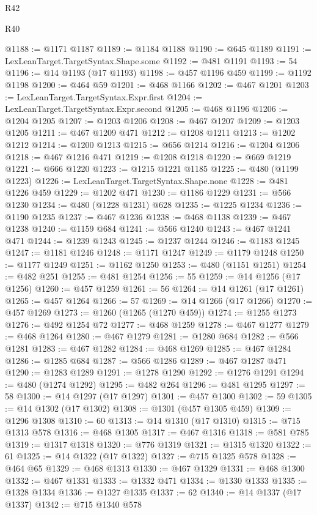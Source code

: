 \begin{lexlean}{R42}
\begin{lexlean}{R40}
\begin{coremodule}
{{{{{{{{{{{{{{{{{{{{{{{{{{{{{{{{{{{{{{{{{{{{{{{{{{{{{{{{{{{{{{{{{{{{{{{{{{{{{{{{{{{{{{{{{{{{{{{{{{{{{{{{{{{{{@1188 := @1171 @1187
@1189 := @1184 @1188
@1190 := @645 @1189
@1191 := LexLeanTarget.TargetSyntax.Shape.some
@1192 := @481 @1191
@1193 := 54
@1196 := @14 @1193 (@17 @1193)
@1198 := @457 @1196 @459
@1199 := @1192 @1198
@1200 := @464 @59
@1201 := @468 @1166
@1202 := @467 @1201
@1203 := LexLeanTarget.TargetSyntax.Expr.first
@1204 := LexLeanTarget.TargetSyntax.Expr.second
@1205 := @468 @1196
@1206 := @1204 @1205
@1207 := @1203 @1206
@1208 := @467 @1207
@1209 := @1203 @1205
@1211 := @467 @1209 @471
@1212 := @1208 @1211
@1213 := @1202 @1212
@1214 := @1200 @1213
@1215 := @656 @1214
@1216 := @1204 @1206
@1218 := @467 @1216 @471
@1219 := @1208 @1218
@1220 := @669 @1219
@1221 := @666 @1220
@1223 := @1215 @1221 @1185
@1225 := @480 (@1199 @1223)
@1226 := LexLeanTarget.TargetSyntax.Shape.none
@1228 := @481 @1226 @459
@1229 := @1202 @471
@1230 := @1186 @1229
@1231 := @566 @1230
@1234 := @480 (@1228 @1231) @628
@1235 := @1225 @1234
@1236 := @1190 @1235
@1237 := @467 @1236
@1238 := @468 @1138
@1239 := @467 @1238
@1240 := @1159 @684
@1241 := @566 @1240
@1243 := @467 @1241 @471
@1244 := @1239 @1243
@1245 := @1237 @1244
@1246 := @1183 @1245
@1247 := @1181 @1246
@1248 := @1171 @1247
@1249 := @1179 @1248
@1250 := @1177 @1249
@1251 := @1162 @1250
@1253 := @480 (@1151 @1251)
@1254 := @482 @251
@1255 := @481 @1254
@1256 := 55
@1259 := @14 @1256 (@17 @1256)
@1260 := @457 @1259
@1261 := 56
@1264 := @14 @1261 (@17 @1261)
@1265 := @457 @1264
@1266 := 57
@1269 := @14 @1266 (@17 @1266)
@1270 := @457 @1269
@1273 := @1260 (@1265 (@1270 @459))
@1274 := @1255 @1273
@1276 := @492 @1254 @72
@1277 := @468 @1259
@1278 := @467 @1277
@1279 := @468 @1264
@1280 := @467 @1279
@1281 := @1280 @684
@1282 := @566 @1281
@1283 := @467 @1282
@1284 := @468 @1269
@1285 := @467 @1284
@1286 := @1285 @684
@1287 := @566 @1286
@1289 := @467 @1287 @471
@1290 := @1283 @1289
@1291 := @1278 @1290
@1292 := @1276 @1291
@1294 := @480 (@1274 @1292)
@1295 := @482 @264
@1296 := @481 @1295
@1297 := 58
@1300 := @14 @1297 (@17 @1297)
@1301 := @457 @1300
@1302 := 59
@1305 := @14 @1302 (@17 @1302)
@1308 := @1301 (@457 @1305 @459)
@1309 := @1296 @1308
@1310 := 60
@1313 := @14 @1310 (@17 @1310)
@1315 := @715 @1313 @578
@1316 := @468 @1305
@1317 := @467 @1316
@1318 := @581 @785
@1319 := @1317 @1318
@1320 := @776 @1319
@1321 := @1315 @1320
@1322 := 61
@1325 := @14 @1322 (@17 @1322)
@1327 := @715 @1325 @578
@1328 := @464 @65
@1329 := @468 @1313
@1330 := @467 @1329
@1331 := @468 @1300
@1332 := @467 @1331
@1333 := @1332 @471
@1334 := @1330 @1333
@1335 := @1328 @1334
@1336 := @1327 @1335
@1337 := 62
@1340 := @14 @1337 (@17 @1337)
@1342 := @715 @1340 @578
}}}}}}}}}}}}}}}}}}}}}}}}}}}}}}}}}}}}}}}}}}}}}}}}}}}}}}}}}}}}}}}}}}}}}}}}}}}}}}}}}}}}}}}}}}}}}}}}}}}}}}}}}}}}}
\end{coremodule}
\end{lexlean}
\end{lexlean}

